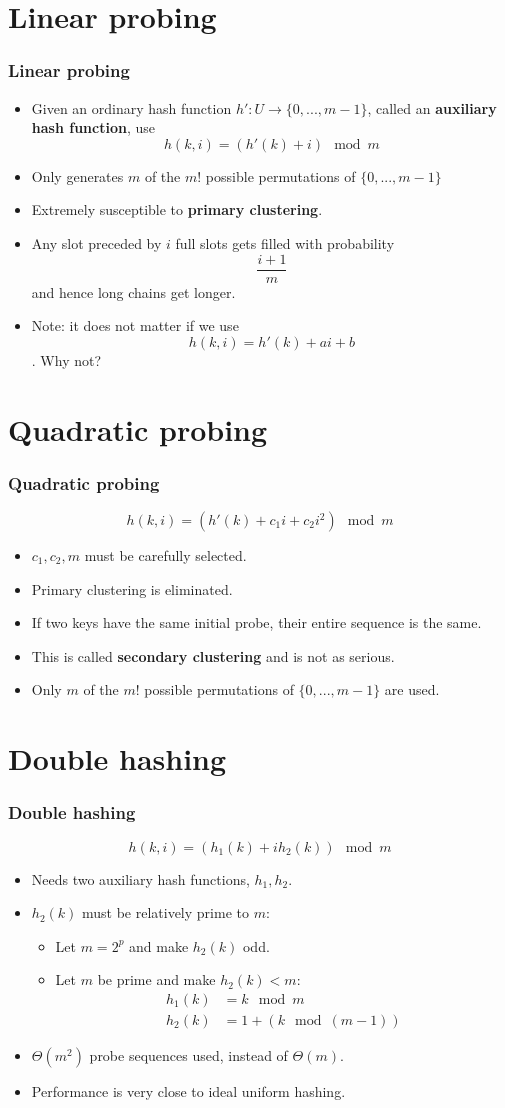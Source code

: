 \documentclass{beamer}
\newcommand{\bi}{\begin{itemize}}
\newcommand{\ii}{\item}
\newcommand{\ei}{\end{itemize}}
\newcommand{\sect}[1]{
\section{#1}
\begin{frame}[fragile]\frametitle{#1}
}
\begin{document}
\sect{Linear probing}
\bi
\ii
Given an ordinary hash function $h' : U \rightarrow \{0,...,m-1\}$,
called an {\bf auxiliary hash function}, use
\[
h(k,i) = (h'(k) + i) \mod m
\]
\ii
Only generates $m$ of the $m!$ possible permutations of $\{0,...,m-1\}$
\ii
Extremely susceptible to {\bf primary clustering}.
\ii
Any slot preceded by $i$ full slots gets filled with probability
\[\frac{i+1}{m}\]
and hence long chains get longer.
\pause
\ii
Note: it does not matter if we use \[h(k,i) = h'(k) + ai + b\].  Why not?
\ei
\end{frame}

\sect{Quadratic probing}

\[
h(k,i) = (h'(k) + c_1i + c_2i^2)\mod m
\]
\bi
\ii $c_1, c_2, m$ must be carefully selected.
\ii
Primary clustering is eliminated.
\ii
If two keys have the same initial probe, their entire sequence
is the same.
\ii
This is called {\bf secondary clustering} and is not as serious.
\ii
Only $m$ of the $m!$ possible permutations of $\{0,...,m-1\}$ are
used. 
\ei
\end{frame}

\sect{Double hashing}
\[
h(k,i) = (h_1(k) + i h_2(k)) \mod m
\]
\bi
\ii Needs two auxiliary hash functions, $h_1, h_2$.
\ii $h_2(k)$ must be relatively prime to $m$:
\bi
\ii Let $m=2^p$ and make $h_2(k)$ odd.
\ii Let $m$ be prime and make $h_2(k) < m$:
\begin{align*}
  h_1(k) &= k \mod m\\
  h_2(k) &= 1 + (k \mod (m-1))
\end{align*}
\ei
\ii $\Theta(m^2)$ probe sequences used, instead of $\Theta(m)$.
\ii Performance is very close to ideal uniform hashing.
\ei
\end{frame}
\end{document}
